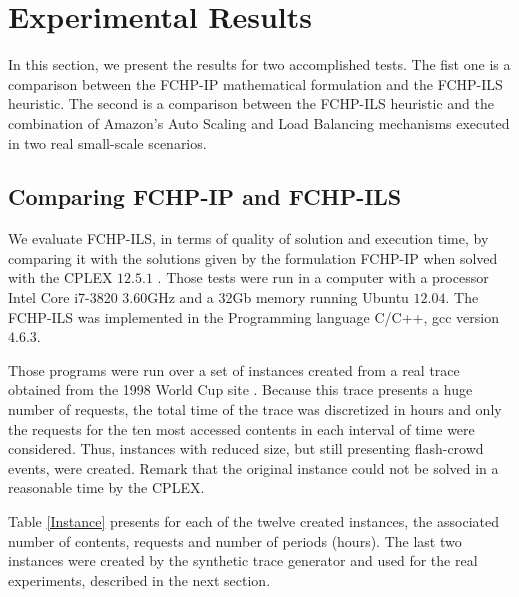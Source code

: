 \section{Experimental Results}
\label{sec:result}

	In this section, we present the results for two accomplished tests. The fist one is a  comparison between the FCHP-IP mathematical formulation and the FCHP-ILS heuristic. The second is a  comparison between the FCHP-ILS heuristic and the combination of  Amazon’s Auto Scaling and Load Balancing mechanisms \cite{AS,ELB}  executed in two real small-scale scenarios.

\subsection{Comparing FCHP-IP and FCHP-ILS}
	 We evaluate FCHP-ILS, in terms of  quality of solution and execution time,  by comparing it with the solutions given by the formulation FCHP-IP when solved with the CPLEX $12.5.1$ \cite{cplex}. Those tests were run  in a computer with a processor Intel Core i7-3820 3.60GHz  and  a 32Gb memory running Ubuntu $12.04$. The  FCHP-ILS was implemented in the Programming language C/C++, gcc version $4.6.3$.
	
	 Those programs were run over a set of instances created from a  real trace obtained from the 1998 World Cup site \cite{copa98}.  Because this trace presents a huge number of requests, the total time of the trace was discretized in hours and only the requests for the ten most accessed contents in each interval of time were considered. Thus, instances with reduced size, but still presenting flash-crowd events, were created. Remark that the original instance could not be solved in a reasonable time by the CPLEX. 

Table \ref{Instance} presents for each of the twelve created instances, the  associated number of contents, requests and number of periods (hours). The last two instances were created by the synthetic trace generator and used for the real experiments, described in the next section.
	
